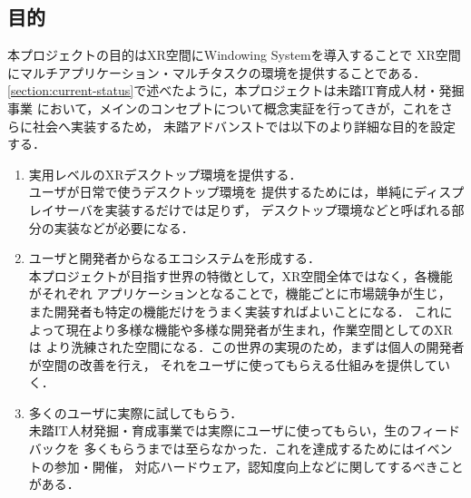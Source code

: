 \subsection{目的}
\label{section:objective}

本プロジェクトの目的はXR空間にWindowing Systemを導入することで
XR空間にマルチアプリケーション・マルチタスクの環境を提供することである．
\ref{section:current-status}で述べたように，本プロジェクトは未踏IT育成人材・発掘事業
において，メインのコンセプトについて概念実証を行ってきが，これをさらに社会へ実装するため，
未踏アドバンストでは以下のより詳細な目的を設定する．

\begin{enumerate}
  \item 実用レベルのXRデスクトップ環境を提供する．\\
        ユーザが日常で使うデスクトップ環境を
        提供するためには，単純にディスプレイサーバを実装するだけでは足りず，
        デスクトップ環境などと呼ばれる部分の実装などが必要になる．
  \item ユーザと開発者からなるエコシステムを形成する．\\ %
        本プロジェクトが目指す世界の特徴として，XR空間全体ではなく，各機能がそれぞれ
        アプリケーションとなることで，機能ごとに市場競争が生じ，
        また開発者も特定の機能だけをうまく実装すればよいことになる．
        これによって現在より多様な機能や多様な開発者が生まれ，作業空間としてのXRは
        より洗練された空間になる．この世界の実現のため，まずは個人の開発者が空間の改善を行え，
        それをユーザに使ってもらえる仕組みを提供していく．
  \item 多くのユーザに実際に試してもらう．\\
        未踏IT人材発掘・育成事業では実際にユーザに使ってもらい，生のフィードバックを
        多くもらうまでは至らなかった．これを達成するためにはイベントの参加・開催，
        対応ハードウェア，認知度向上などに関してするべきことがある．
\end{enumerate}
